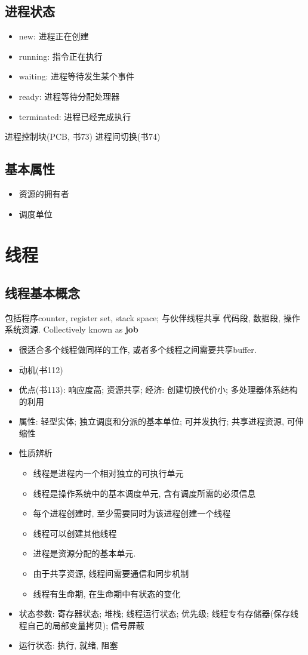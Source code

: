 \documentclass[a4paper, UTF8]{article}
\begin{document}
\subsection{进程状态}
\begin{itemize}
\item new: 进程正在创建
\item running: 指令正在执行
\item waiting: 进程等待发生某个事件
\item ready: 进程等待分配处理器
\item terminated: 进程已经完成执行
\end{itemize}

进程控制块(PCB, 书73)
进程间切换(书74)
\subsection{基本属性}
\begin{itemize}
\item 资源的拥有者
\item 调度单位
\end{itemize}
\newpage
\section{线程}
\subsection{线程基本概念}
包括程序counter, register set, stack space; 与伙伴线程共享 代码段, 数据段, 操作系统资源. Collectively known as \textbf{job}
\begin{itemize}
\item 很适合多个线程做同样的工作, 或者多个线程之间需要共享buffer.
\item 动机(书112)
\item 优点(书113): 响应度高; 资源共享; 经济: 创建切换代价小; 多处理器体系结构的利用
\item 属性: 轻型实体; 独立调度和分派的基本单位; 可并发执行; 共享进程资源, 可伸缩性
\item 性质辨析
	\begin{itemize}
	\item 线程是进程内一个相对独立的可执行单元
	\item 线程是操作系统中的基本调度单元, 含有调度所需的必须信息
	\item 每个进程创建时, 至少需要同时为该进程创建一个线程
	\item 线程可以创建其他线程
	\item 进程是资源分配的基本单元.
	\item 由于共享资源, 线程间需要通信和同步机制
	\item 线程有生命期, 在生命期中有状态的变化
	\end{itemize}
\item 状态参数: 寄存器状态; 堆栈; 线程运行状态; 优先级; 线程专有存储器(保存线程自己的局部变量拷贝); 信号屏蔽
\item 运行状态: 执行, 就绪, 阻塞
\end{itemize}
\end{document}

